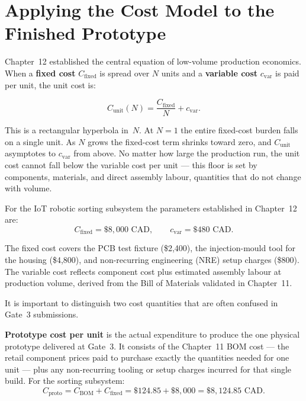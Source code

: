 \section{Applying the Cost Model to the Finished Prototype}
\label{sec:ch17-cost-model}

Chapter~12 established the central equation of low-volume production
economics.
When a \textbf{fixed cost} $C_{\text{fixed}}$ is spread
over $N$ units and a \textbf{variable cost}
$c_{\text{var}}$ is paid per unit, the unit cost is:

\begin{equation}
  C_{\text{unit}}(N) = \frac{C_{\text{fixed}}}{N} + c_{\text{var}}.
  \label{eq:ch17-cunit}
\end{equation}

This is a rectangular hyperbola in~$N$.
At $N = 1$ the entire fixed-cost burden falls on a single unit.
As $N$ grows the fixed-cost term shrinks toward zero, and $C_{\text{unit}}$
asymptotes to $c_{\text{var}}$ from above.
No matter how large the production run, the unit cost cannot fall below the
variable cost per unit --- this floor is set by components, materials, and
direct assembly labour, quantities that do not change with volume.

For the IoT robotic sorting subsystem the parameters established in
Chapter~12 are:
\[
  C_{\text{fixed}} = \$8{,}000\text{ CAD}, \qquad
  c_{\text{var}}   = \$480\text{ CAD}.
\]

The fixed cost covers the PCB test fixture (\$2,400), the injection-mould
tool for the housing (\$4,800), and non-recurring engineering (NRE) setup
charges (\$800).
The variable cost reflects component cost plus estimated assembly labour at
production volume, derived from the Bill of Materials validated in
Chapter~11.

It is important to distinguish two cost quantities that are often confused
in Gate~3 submissions.

\textbf{Prototype cost per unit} is the actual
expenditure to produce the one physical prototype delivered at Gate~3.
It consists of the Chapter~11 BOM cost --- the retail component prices paid
to purchase exactly the quantities needed for one unit --- plus any
non-recurring tooling or setup charges incurred for that single build.
For the sorting subsystem:
\[
  C_{\text{proto}} = C_{\text{BOM}} + C_{\text{fixed}}
                   = \$124.85 + \$8{,}000 = \$8{,}124.85\text{ CAD.}
\]

